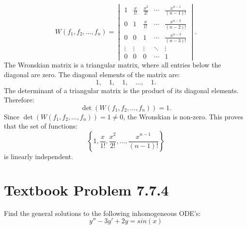 \documentclass[12pt]{article}
\begin{document}
        \[
        W(f_1, f_2, \ldots, f_n) =
        \begin{vmatrix}
        1 & \frac{x}{1!} & \frac{x^2}{2!} & \cdots & \frac{x^{n-1}}{(n-1)!} \\
        0 & 1 & \frac{x}{1!} & \cdots & \frac{x^{n-2}}{(n-2)!} \\
        0 & 0 & 1 & \cdots & \frac{x^{n-3}}{(n-3)!} \\
        \vdots & \vdots & \vdots & \ddots & \vdots \\
        0 & 0 & 0 & \cdots & 1
        \end{vmatrix}.
        \]
        The Wronskian matrix is a triangular matrix, where all entries below the diagonal are zero. The diagonal elements of the matrix are:
        \[
        1, \quad 1, \quad 1, \quad \ldots, \quad 1.
        \]
        The determinant of a triangular matrix is the product of its diagonal elements. Therefore:
        \[
        \det(W(f_1, f_2, \ldots, f_n)) = 1.
        \]
        Since \( \det(W(f_1, f_2, \ldots, f_n)) = 1 \neq 0 \), the Wronskian is non-zero. This proves that the set of functions:
        \[
        \left\{1, \frac{x}{1!}, \frac{x^2}{2!}, \ldots, \frac{x^{n-1}}{(n-1)!}\right\}
        \]
        is linearly independent.
    
\section*{Textbook Problem 7.7.4}
    Find the general solutions to the following inhomogeneous ODE's:
    \[
        y'' - 3y' + 2y = sin(x)
    \]
\end{document}
